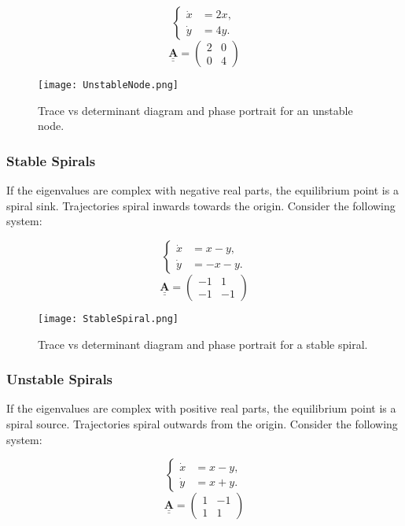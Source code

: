 \documentclass{amsbook}
\begin{document}
$$
\begin{cases}
\dot{x} &= 2x, \\
\dot{y} &= 4y.
\end{cases}
$$
$$
\underline{\underline{\mathbf{A}}} = \begin{pmatrix} 2 & 0 \\ 0 & 4 \end{pmatrix}
$$

\begin{figure}[H]
    \centering
    \texttt{[image: UnstableNode.png]}
    \caption{Trace vs determinant diagram and phase portrait for an unstable node.}
    \label{fig:UnstableNode}
\end{figure}

\subsubsection{\textbf{Stable Spirals}}
If the eigenvalues are complex with negative real parts, the equilibrium point is a spiral sink. Trajectories spiral inwards towards the origin. Consider the following system:

$$
\begin{cases}
\dot{x} &= x - y, \\
\dot{y} &= -x - y.
\end{cases}
$$
$$
\underline{\underline{\mathbf{A}}} = \begin{pmatrix} -1 & 1 \\ -1 & -1 \end{pmatrix}
$$

\begin{figure}[H]
    \centering
    \texttt{[image: StableSpiral.png]}
    \caption{Trace vs determinant diagram and phase portrait for a stable spiral.}
    \label{fig:StableSpiral}
\end{figure}

\subsubsection{\textbf{Unstable Spirals}}
If the eigenvalues are complex with positive real parts, the equilibrium point is a spiral source. Trajectories spiral outwards from the origin. Consider the following system:

$$
\begin{cases}
\dot{x} &= x - y, \\
\dot{y} &= x + y.
\end{cases}
$$
$$
\underline{\underline{\mathbf{A}}} = \begin{pmatrix} 1 & -1 \\ 1 & 1 \end{pmatrix}
$$
\end{document}
